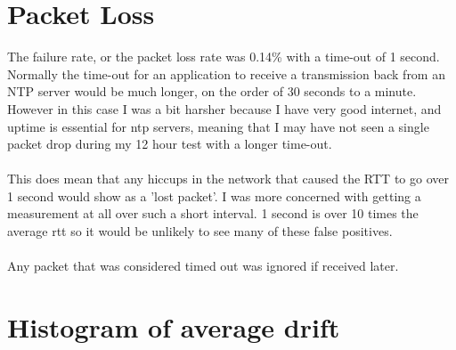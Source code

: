 \documentclass{article}
\begin{document}
\section*{Packet Loss}
The failure rate, or the packet loss rate was 0.14\% with a time-out of 1 second. Normally the time-out for an application to receive a transmission back from an NTP server would be much longer, on the order of 30 seconds to a minute. However in this case I was a bit harsher because I have very good internet, and uptime is essential for ntp servers, meaning that I may have not seen a single packet drop during my 12 hour test with a longer time-out. \\
\\
This does mean that any hiccups in the network that caused the RTT to go over 1 second would show as a 'lost packet'. I was more concerned with getting a measurement at all over such a short interval. 1 second is over 10 times the average rtt so it would be unlikely to see many of these false positives. \\
\\
Any packet that was considered timed out was ignored if received later. 


\section*{Histogram of average drift}
\end{document}

